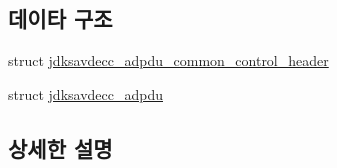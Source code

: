 \subsection*{데이타 구조}
\begin{DoxyCompactItemize}
\item 
struct \hyperlink{structjdksavdecc__adpdu__common__control__header}{jdksavdecc\+\_\+adpdu\+\_\+common\+\_\+control\+\_\+header}
\item 
struct \hyperlink{structjdksavdecc__adpdu}{jdksavdecc\+\_\+adpdu}
\end{DoxyCompactItemize}


\subsection{상세한 설명}

